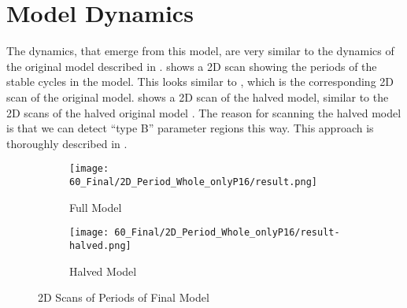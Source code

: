 \section{Model Dynamics}

The dynamics, that emerge from this model, are very similar to the dynamics of the original model described in .
 shows a 2D scan showing the periods of the stable cycles in the model.
This looks similar to , which is the corresponding 2D scan of the original model.
 shows a 2D scan of the halved model, similar to the 2D scans of the halved original model .
The reason for scanning the halved model is that we can detect ``type B'' parameter regions this way.
This approach is thoroughly described in .

\begin{figure}
    \centering
    \begin{subfigure}{0.4\textwidth}
        \centering
        \texttt{[image: 60\_Final/2D\_Period\_Whole\_onlyP16/result.png]}
        \caption{Full Model}
        \label{fig:final.period.whole.full}
    \end{subfigure}
    \begin{subfigure}{0.4\textwidth}
        \centering
        \texttt{[image: 60\_Final/2D\_Period\_Whole\_onlyP16/result-halved.png]}
        \caption{Halved Model}
        \label{fig:final.period.whole.halved}
    \end{subfigure}
    \caption{2D Scans of Periods of Final Model}
\end{figure}
